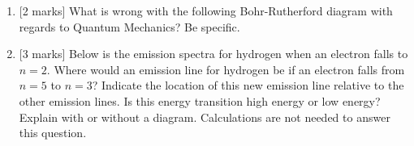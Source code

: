 \documentclass[11pt]{article}
\begin{document}
\begin{enumerate}
    \item {[2 marks]} What is wrong with the following Bohr-Rutherford diagram with regards to Quantum Mechanics? Be specific.
    
    \begin{minipage}{0.3\textwidth}
    \end{minipage}
    \begin{minipage}{0.65\textwidth}
        \vspace{3cm}
        \hrulefill
        
        \hrulefill
    \end{minipage}

    \item {[3 marks]} Below is the emission spectra for hydrogen when an electron falls to $n = 2$. Where would an emission line for hydrogen be if an electron falls from $n = 5$ to $n = 3$? Indicate the location of this new emission line relative to the other emission lines. Is this energy transition high energy or low energy? Explain with or without a diagram. Calculations are not needed to answer this question.

    \begin{center}
\end{center}
\end{enumerate}
\end{document}
